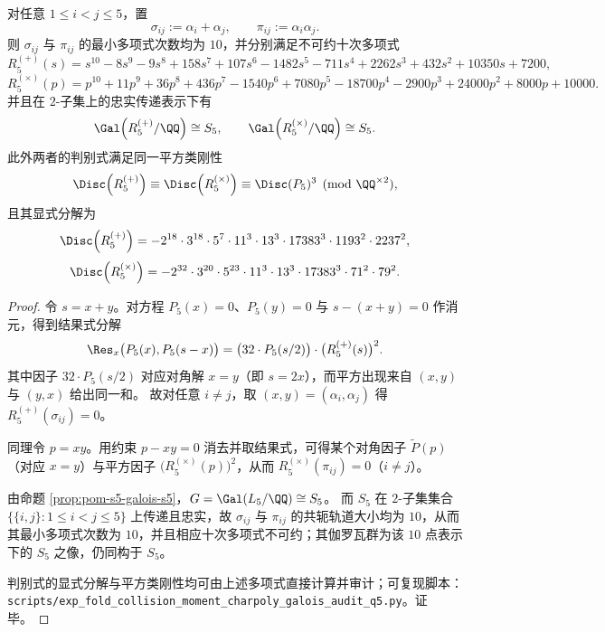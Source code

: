 \begin{proposition}\label{prop:pom-s5-two-subset-degree10}
对任意 \(1\le i<j\le 5\)，置
\[
\sigma_{ij}:=\alpha_i+\alpha_j,\qquad \pi_{ij}:=\alpha_i\alpha_j.
\]
则 \(\sigma_{ij}\) 与 \(\pi_{ij}\) 的最小多项式次数均为 \(10\)，并分别满足不可约十次多项式
\[
R^{(+)}_5(s)
=s^{10}-8s^9-9s^8+158s^7+107s^6-1482s^5-711s^4+2262s^3+432s^2+10350s+7200,
\]
\[
R^{(\times)}_5(p)
=p^{10}+11p^9+36p^8+436p^7-1540p^6+7080p^5-18700p^4-2900p^3+24000p^2+8000p+10000.
\]
并且在 \(2\)-子集上的忠实传递表示下有
\[
\Gal\!\left(R^{(+)}_5/\QQ\right)\cong S_5,
\qquad
\Gal\!\left(R^{(\times)}_5/\QQ\right)\cong S_5.
\]
此外两者的判别式满足同一平方类刚性
\[
\Disc\!\left(R^{(+)}_5\right)\equiv \Disc\!\left(R^{(\times)}_5\right)\equiv \Disc(P_5)^3
\pmod{\QQ^{\times 2}},
\]
且其显式分解为
\[
\Disc\!\left(R^{(+)}_5\right)
=-2^{18}\cdot 3^{18}\cdot 5^{7}\cdot 11^{3}\cdot 13^{3}\cdot 17383^{3}\cdot 1193^{2}\cdot 2237^{2},
\]
\[
\Disc\!\left(R^{(\times)}_5\right)
=-2^{32}\cdot 3^{20}\cdot 5^{23}\cdot 11^{3}\cdot 13^{3}\cdot 17383^{3}\cdot 71^{2}\cdot 79^{2}.
\]
\end{proposition}
\begin{proof}
令 \(s=x+y\)。对方程 \(P_5(x)=0\)、\(P_5(y)=0\) 与 \(s-(x+y)=0\) 作消元，得到结果式分解
\[
\Res_x\bigl(P_5(x),P_5(s-x)\bigr)=\bigl(32\cdot P_5(s/2)\bigr)\cdot \bigl(R^{(+)}_5(s)\bigr)^2.
\]
其中因子 \(32\cdot P_5(s/2)\) 对应对角解 \(x=y\)（即 \(s=2x\)），而平方出现来自 \((x,y)\) 与 \((y,x)\) 给出同一和。
故对任意 \(i\neq j\)，取 \((x,y)=(\alpha_i,\alpha_j)\) 得 \(R^{(+)}_5(\sigma_{ij})=0\)。
\par
同理令 \(p=xy\)。用约束 \(p-xy=0\) 消去并取结果式，可得某个对角因子 \(\widetilde P(p)\)（对应 \(x=y\)）与平方因子 \(\bigl(R^{(\times)}_5(p)\bigr)^2\)，从而 \(R^{(\times)}_5(\pi_{ij})=0\)（\(i\neq j\)）。
\par
由命题 \ref{prop:pom-s5-galois-s5}，\(G=\Gal(L_5/\QQ)\cong S_5\)。
而 \(S_5\) 在 \(2\)-子集集合 \(\{\{i,j\}:1\le i<j\le 5\}\) 上传递且忠实，故 \(\sigma_{ij}\) 与 \(\pi_{ij}\) 的共轭轨道大小均为 \(10\)，从而其最小多项式次数为 \(10\)，并且相应十次多项式不可约；其伽罗瓦群为该 \(10\) 点表示下的 \(S_5\) 之像，仍同构于 \(S_5\)。
\par
判别式的显式分解与平方类刚性均可由上述多项式直接计算并审计；可复现脚本：\texttt{scripts/exp\_fold\_collision\_moment\_charpoly\_galois\_audit\_q5.py}。证毕。
\end{proof}

